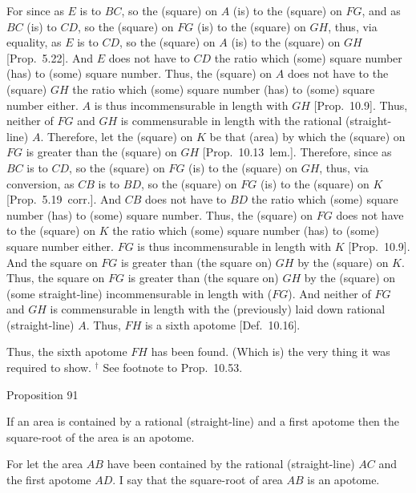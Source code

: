 For since as $E$ is to $BC$, so the (square) on $A$ (is) to the (square)
on $FG$, and as $BC$ (is) to $CD$, so the (square) on $FG$ (is) to
the (square) on $GH$, thus, via equality, as $E$ is to $CD$, so the
(square) on $A$ (is) to the (square) on $GH$ [Prop.~5.22]. And $E$ does not have to $CD$
the ratio which (some) square number (has) to (some) square number.
Thus, the (square) on $A$ does not have to the (square) $GH$ the
ratio which (some) square number (has) to (some) square number either. $A$ is thus incommensurable in length with $GH$ [Prop.~10.9]. Thus, neither of $FG$ and $GH$
is commensurable in length with the rational (straight-line) $A$. Therefore, let the (square)
on $K$ be that (area) by which the (square) on $FG$ is greater than the (square) on $GH$ [Prop.~10.13~lem.].
 Therefore, since as $BC$ is to $CD$, so the (square) on $FG$ (is) to the
(square) on $GH$, thus, via conversion, as $CB$ is to $BD$, so the (square)
on $FG$ (is) to the (square) on $K$ [Prop.~5.19~corr.]. And $CB$ does not have
to $BD$ the ratio which (some) square number (has) to (some) square
number. Thus, the (square) on $FG$ does not have to the (square) on
$K$ the ratio which (some) square number (has) to (some) square number
either. $FG$ is thus incommensurable in length with $K$ [Prop.~10.9]. And the square on $FG$ is greater
than (the square on) $GH$ by the (square) on $K$.
Thus, the square on
$FG$ is greater than (the square on) $GH$ by the (square)
on (some straight-line) incommensurable in length with ($FG$).
And neither of $FG$ and $GH$ is commensurable in length
with the (previously) laid down rational (straight-line) $A$. Thus,
$FH$ is a sixth apotome [Def.~10.16].

Thus, the sixth apotome $FH$ has been found. (Which is) the
very thing it was required to show.
{\footnotesize\noindent$^\dag$ See footnote to Prop.~10.53.}


\begin{center}
{\large Proposition 91}
\end{center}

If an area is contained by a rational (straight-line)
and a first apotome then the square-root of the area is an apotome.

For let the area $AB$ have been contained by the rational (straight-line) $AC$ and the first apotome $AD$. I say that the square-root of area $AB$ is an apotome.

\epsfysize=1.3in
\centerline{}


